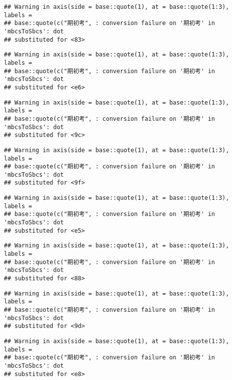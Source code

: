 \documentclass[
]{book}
\begin{document}
\begin{verbatim}
## Warning in axis(side = base::quote(1), at = base::quote(1:3), labels =
## base::quote(c("期初考", : conversion failure on '期初考' in 'mbcsToSbcs': dot
## substituted for <83>
\end{verbatim}

\begin{verbatim}
## Warning in axis(side = base::quote(1), at = base::quote(1:3), labels =
## base::quote(c("期初考", : conversion failure on '期初考' in 'mbcsToSbcs': dot
## substituted for <e6>
\end{verbatim}

\begin{verbatim}
## Warning in axis(side = base::quote(1), at = base::quote(1:3), labels =
## base::quote(c("期初考", : conversion failure on '期初考' in 'mbcsToSbcs': dot
## substituted for <9c>
\end{verbatim}

\begin{verbatim}
## Warning in axis(side = base::quote(1), at = base::quote(1:3), labels =
## base::quote(c("期初考", : conversion failure on '期初考' in 'mbcsToSbcs': dot
## substituted for <9f>
\end{verbatim}

\begin{verbatim}
## Warning in axis(side = base::quote(1), at = base::quote(1:3), labels =
## base::quote(c("期初考", : conversion failure on '期初考' in 'mbcsToSbcs': dot
## substituted for <e5>
\end{verbatim}

\begin{verbatim}
## Warning in axis(side = base::quote(1), at = base::quote(1:3), labels =
## base::quote(c("期初考", : conversion failure on '期初考' in 'mbcsToSbcs': dot
## substituted for <88>
\end{verbatim}

\begin{verbatim}
## Warning in axis(side = base::quote(1), at = base::quote(1:3), labels =
## base::quote(c("期初考", : conversion failure on '期初考' in 'mbcsToSbcs': dot
## substituted for <9d>
\end{verbatim}

\begin{verbatim}
## Warning in axis(side = base::quote(1), at = base::quote(1:3), labels =
## base::quote(c("期初考", : conversion failure on '期初考' in 'mbcsToSbcs': dot
## substituted for <e8>
\end{verbatim}
\end{document}
